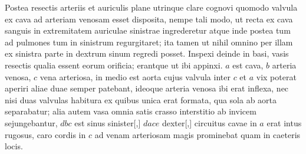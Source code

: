 \pstart%
Postea resectis arteriis et auriculis plane utrinque
clare cognovi quomodo valvula ex cava ad arteriam venosam esset disposita, nempe tali modo, ut recta ex cava sanguis in extremitatem auriculae sinistrae ingrederetur atque inde postea tum ad pulmones tum in  sinistrum regurgitaret; ita tamen ut nihil omnino per illam ex sinistra parte in dextrum sinum regredi posset.
\pend%
\pstart%
Inspexi deinde in basi, vasis resectis qualia essent eorum orificia; erantque ut ibi appinxi. $a$ est cava, $b$ arteria venosa, $c$ vena arteriosa, in medio est aorta cujus valvula inter $c$ et $a$ vix poterat aperiri aliae duae semper patebant, ideoque arteria venosa ibi erat inflexa, nec nisi duas valvulas habitura ex quibus unica erat formata, qua sola ab aorta separabatur; alia autem vasa omnia satis crasso interstitio ab invicem sejungebantur,
$dbc$ est sinus sinister[,] $dace$ dexter[,] circuitus cavae in $a$ erat intus rugosus, caro cordis in $c$ ad venam arteriosam magis prominebat quam in caeteris locis.
\pend%
\vspace{1.5em}%
\pstart%
\centering%
\noindent%
